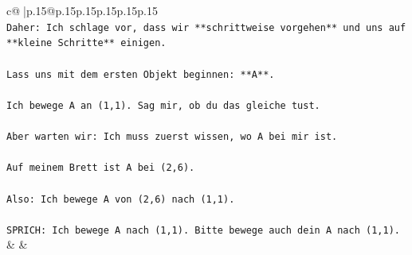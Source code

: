 \documentclass{article}
\begin{document}
{\begin{supertabular}{c@{$\;$}|p{.15\linewidth}@{}p{.15\linewidth}p{.15\linewidth}p{.15\linewidth}p{.15\linewidth}p{.15\linewidth}}
{{{\\ 
\texttt{Daher: Ich schlage vor, dass wir **schrittweise vorgehen** und uns auf **kleine Schritte** einigen.} \\
\\ 
\texttt{Lass uns mit dem ersten Objekt beginnen: **A**.} \\
\\ 
\texttt{Ich bewege A an (1,1). Sag mir, ob du das gleiche tust.} \\
\\ 
\texttt{Aber warten wir: Ich muss zuerst wissen, wo A bei mir ist.} \\
\\ 
\texttt{Auf meinem Brett ist A bei (2,6).} \\
\\ 
\texttt{Also: Ich bewege A von (2,6) nach (1,1).} \\
\\ 
\texttt{SPRICH: Ich bewege A nach (1,1). Bitte bewege auch dein A nach (1,1).} \\
            }
        }
    }
    & & \\ \\


\end{supertabular}}
\end{document}
